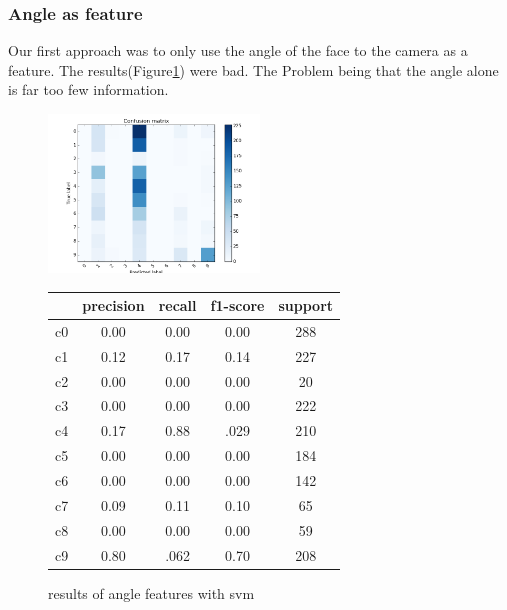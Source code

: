 \documentclass[10pt,twocolumn,letterpaper]{article}
\begin{document}
	\subsubsection{Angle as feature}
	Our first approach was to only use the angle of the face to the camera as a feature. The results(Figure\ref{headpose_feature}) were bad. The Problem being that the angle alone is far too few information.
	\begin{figure}[h]
	\centering
	\includegraphics[width=0.5\textwidth]{angle_only}\hspace{0.01\textwidth}
	\begin{tabular}{c||c|c|c|c}
	  & precision&recall&f1-score&support\\	\hline
	 c0&0.00&0.00&0.00&288\\
	 c1&0.12&0.17&0.14&227\\
	 c2&0.00&0.00&0.00&20\\
	 c3&0.00&0.00&0.00&222\\
	 c4&0.17&0.88&.029&210\\
	 c5&0.00&0.00&0.00&184\\
	 c6&0.00&0.00&0.00&142\\
	 c7&0.09&0.11&0.10&65\\
	 c8&0.00&0.00&0.00&59\\
	 c9&0.80&.062&0.70&208
	\end{tabular}
	\caption{results of angle features with svm}
	\label{headpose_feature}
	\end{figure}
\end{document}
